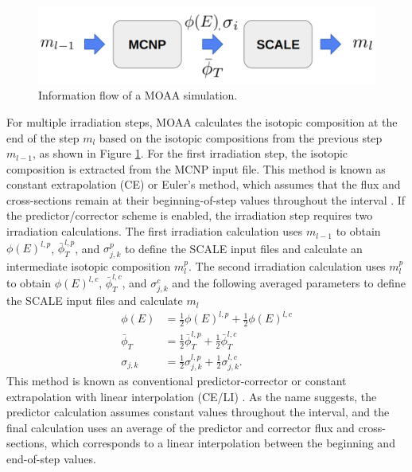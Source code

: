 \begin{figure}[htbp!]
  \begin{center}
    \includegraphics[scale=0.32]{figures/diagram_3}
  \end{center}
  \caption{Information flow of a MOAA simulation.}
  \label{fig:workflow_2}
\end{figure}

For multiple irradiation steps, MOAA calculates the isotopic composition at the end of the step $m_l$ based on the isotopic compositions from the previous step $m_{l-1}$, as shown in Figure \ref{fig:workflow_2}.
For the first irradiation step, the isotopic composition is extracted from the MCNP input file.
This method is known as constant extrapolation (CE) or Euler's method, which assumes that the flux and cross-sections remain at their beginning-of-step values throughout the interval \cite{leppanen_burnup_2012}.
If the predictor/corrector scheme is enabled, the irradiation step requires two irradiation calculations.
The first irradiation calculation uses $m_{l-1}$ to obtain $\phi(E)^{l, p}$, $\bar{\phi}_T^{l, p}$, and $\sigma_{j,k}^{p}$ to define the SCALE input files and calculate an intermediate isotopic composition $m_l^p$.
The second irradiation calculation uses $m_l^p$ to obtain $\phi(E)^{l, c}$, $\bar{\phi}_T^{l, c}$, and $\sigma_{j,k}^{c}$ and the following averaged parameters to define the SCALE input files and calculate $m_l$
\begin{align}
\phi(E) &= \frac{1}{2}\phi(E)^{l, p} + \frac{1}{2}\phi(E)^{l, c} \\
\bar{\phi}_T &= \frac{1}{2} \bar{\phi}_T^{l, p} + \frac{1}{2} \bar{\phi}_T^{l, c} \\
\sigma_{j,k} &= \frac{1}{2}\sigma_{j,k}^{l, p} + \frac{1}{2}\sigma_{j,k}^{l, c}.
\end{align}
This method is known as conventional predictor-corrector or constant extrapolation with linear interpolation (CE/LI) \cite{leppanen_burnup_2012}.
As the name suggests, the predictor calculation assumes constant values throughout the interval, and the final calculation uses an average of the predictor and corrector flux and cross-sections, which corresponds to a linear interpolation between the beginning and end-of-step values.

